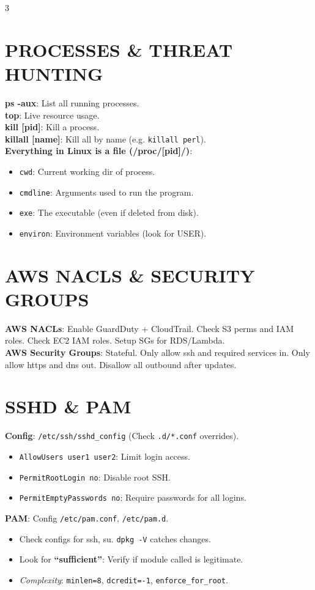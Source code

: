 \documentclass[7pt,landscape]{article}
\begin{document}
\begin{multicols*}{3}
\section{PROCESSES \& THREAT HUNTING}
\textbf{ps -aux}: List all running processes. \\
\textbf{top}: Live resource usage. \\
\textbf{kill [pid]}: Kill a process. \\
\textbf{killall [name]}: Kill all by name (e.g. \texttt{killall perl}). \\
\textbf{Everything in Linux is a file (/proc/[pid]/)}:
\begin{itemize}
    \item \texttt{cwd}: Current working dir of process.
    \item \texttt{cmdline}: Arguments used to run the program.
    \item \texttt{exe}: The executable (even if deleted from disk).
    \item \texttt{environ}: Environment variables (look for USER).
\end{itemize}

\section{AWS NACLS \& SECURITY GROUPS}
\textbf{AWS NACLs}: Enable GuardDuty + CloudTrail. Check S3 perms and IAM roles. Check EC2 IAM roles. Setup SGs for RDS/Lambda. \\
\textbf{AWS Security Groups}: Stateful. Only allow ssh and required services in. Only allow https and dns out. Disallow all outbound after updates.

\section{SSHD \& PAM}
\textbf{Config}: \texttt{/etc/ssh/sshd\_config} (Check \texttt{.d/*.conf} overrides).
\begin{itemize}
    \item \texttt{AllowUsers user1 user2}: Limit login access.
    \item \texttt{PermitRootLogin no}: Disable root SSH.
    \item \texttt{PermitEmptyPasswords no}: Require passwords for all logins.
\end{itemize}
\textbf{PAM}: Config \texttt{/etc/pam.conf}, \texttt{/etc/pam.d}.
\begin{itemize}
    \item Check configs for ssh, su. \texttt{dpkg -V} catches changes.
    \item Look for \textbf{“sufficient”}: Verify if module called is legitimate.
    \item \textit{Complexity}: \texttt{minlen=8}, \texttt{dcredit=-1}, \texttt{enforce\_for\_root}.
\end{itemize}

\end{multicols*}
\end{document}
